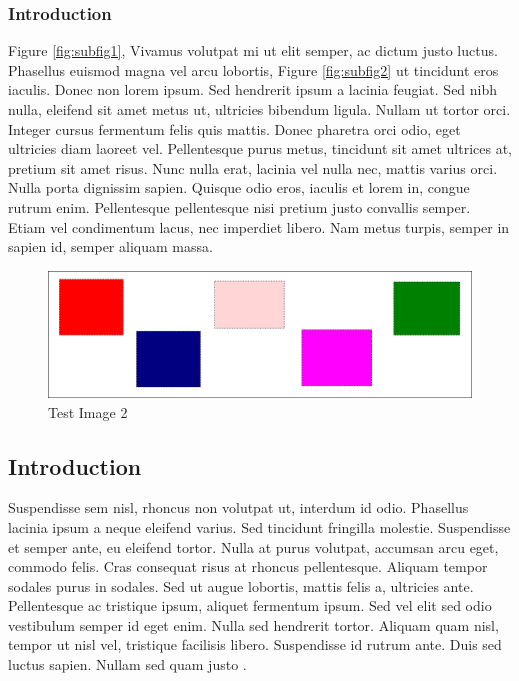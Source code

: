 \subsubsection{Introduction}
Figure \ref{fig:subfig1}, Vivamus volutpat mi ut elit semper, ac dictum justo luctus. Phasellus euismod
magna vel arcu lobortis, Figure \ref{fig:subfig2} ut tincidunt eros iaculis. Donec non lorem ipsum. Sed
hendrerit ipsum a lacinia feugiat. Sed nibh nulla, eleifend sit amet metus ut,
ultricies bibendum ligula. Nullam ut tortor orci. Integer cursus fermentum
felis quis mattis. Donec pharetra orci odio, eget ultricies diam laoreet vel.
Pellentesque purus metus, tincidunt sit amet ultrices at, pretium sit amet
risus. Nunc nulla erat, lacinia vel nulla nec, mattis varius orci. Nulla porta
dignissim sapien. Quisque odio eros, iaculis et lorem in, congue rutrum enim.
Pellentesque pellentesque nisi pretium justo convallis semper. Etiam vel
condimentum lacus, nec imperdiet libero. Nam metus turpis, semper in sapien id,
semper aliquam massa.

\begin{figure}[h]
    \centering
    \includegraphics[width=\textwidth]{figures/test_image}
    \caption{Test Image 2}
    \label{fig:test_image2}
\end{figure}

\subsection{Introduction}
Suspendisse sem nisl, rhoncus non volutpat ut, interdum id odio. Phasellus
lacinia ipsum a neque eleifend varius. Sed tincidunt fringilla molestie.
Suspendisse et semper ante, eu eleifend tortor. Nulla at purus volutpat,
accumsan arcu eget, commodo felis. Cras consequat risus at rhoncus
pellentesque. Aliquam tempor sodales purus in sodales. Sed ut augue lobortis,
mattis felis a, ultricies ante. Pellentesque ac tristique ipsum, aliquet
fermentum ipsum. Sed vel elit sed odio vestibulum semper id eget enim. Nulla
sed hendrerit tortor. Aliquam quam nisl, tempor ut nisl vel, tristique
facilisis libero. Suspendisse id rutrum ante. Duis sed luctus sapien. Nullam
sed quam justo \cite{web:website}.
